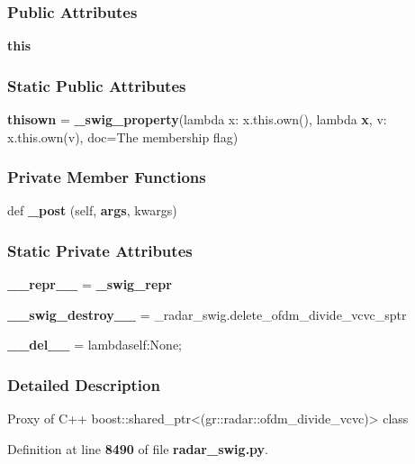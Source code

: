 \subsubsection*{Public Attributes}
\begin{DoxyCompactItemize}
\item 
{\bf this}
\end{DoxyCompactItemize}
\subsubsection*{Static Public Attributes}
\begin{DoxyCompactItemize}
\item 
{\bf thisown} = {\bf \+\_\+swig\+\_\+property}(lambda x\+: x.\+this.\+own(), lambda {\bf x}, v\+: x.\+this.\+own(v), doc=\textquotesingle{}The membership flag\textquotesingle{})
\end{DoxyCompactItemize}
\subsubsection*{Private Member Functions}
\begin{DoxyCompactItemize}
\item 
def {\bf \+\_\+post} (self, {\bf args}, kwargs)
\end{DoxyCompactItemize}
\subsubsection*{Static Private Attributes}
\begin{DoxyCompactItemize}
\item 
{\bf \+\_\+\+\_\+repr\+\_\+\+\_\+} = {\bf \+\_\+swig\+\_\+repr}
\item 
{\bf \+\_\+\+\_\+swig\+\_\+destroy\+\_\+\+\_\+} = \+\_\+radar\+\_\+swig.\+delete\+\_\+ofdm\+\_\+divide\+\_\+vcvc\+\_\+sptr
\item 
{\bf \+\_\+\+\_\+del\+\_\+\+\_\+} = lambdaself\+:\+None;
\end{DoxyCompactItemize}


\subsubsection{Detailed Description}
\begin{DoxyVerb}Proxy of C++ boost::shared_ptr<(gr::radar::ofdm_divide_vcvc)> class\end{DoxyVerb}
 

Definition at line {\bf 8490} of file {\bf radar\+\_\+swig.\+py}.



